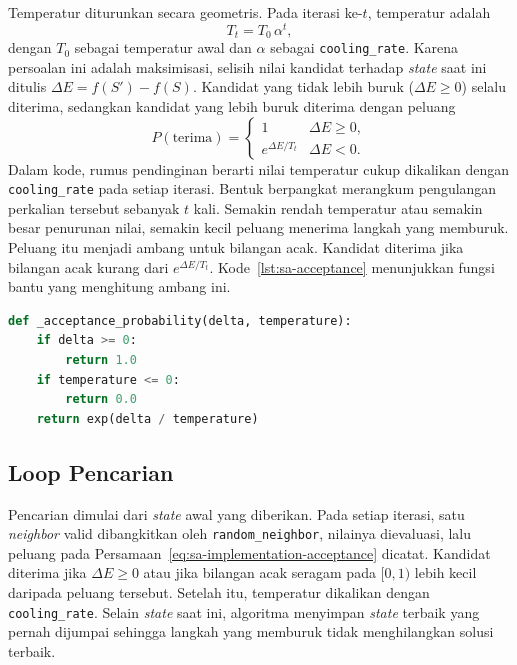 Temperatur diturunkan secara geometris. Pada iterasi ke-$t$, temperatur adalah
\begin{equation}
    T_t = T_0\,\alpha^{t},
    \label{eq:sa-implementation-cooling}
\end{equation}
dengan $T_0$ sebagai temperatur awal dan $\alpha$ sebagai \texttt{cooling\_rate}. Karena persoalan ini adalah maksimisasi, selisih nilai kandidat terhadap \textit{state} saat ini ditulis $\Delta E=f(S')-f(S)$. Kandidat yang tidak lebih buruk ($\Delta E\ge 0$) selalu diterima, sedangkan kandidat yang lebih buruk diterima dengan peluang
\begin{equation}
    P(\text{terima})=
    \begin{cases}
        1                & \Delta E \ge 0, \\
        e^{\Delta E/T_t} & \Delta E < 0.
    \end{cases}
    \label{eq:sa-implementation-acceptance}
\end{equation}
Dalam kode, rumus pendinginan berarti nilai temperatur cukup dikalikan dengan \texttt{cooling\_rate} pada setiap iterasi. Bentuk berpangkat merangkum pengulangan perkalian tersebut sebanyak $t$ kali. Semakin rendah temperatur atau semakin besar penurunan nilai, semakin kecil peluang menerima langkah yang memburuk. Peluang itu menjadi ambang untuk bilangan acak. Kandidat diterima jika bilangan acak kurang dari $e^{\Delta E/T_t}$. Kode~\ref{lst:sa-acceptance} menunjukkan fungsi bantu yang menghitung ambang ini.

\begin{lstlisting}[language=Python, caption={Peluang penerimaan kandidat},label={lst:sa-acceptance}]
def _acceptance_probability(delta, temperature):
    if delta >= 0:
        return 1.0
    if temperature <= 0:
        return 0.0
    return exp(delta / temperature)
\end{lstlisting}

\subsection{Loop Pencarian}

Pencarian dimulai dari \textit{state} awal yang diberikan. Pada setiap iterasi, satu \textit{neighbor} valid dibangkitkan oleh \texttt{random\_neighbor}, nilainya dievaluasi, lalu peluang pada Persamaan~\ref{eq:sa-implementation-acceptance} dicatat. Kandidat diterima jika $\Delta E\ge 0$ atau jika bilangan acak seragam pada $[0,1)$ lebih kecil daripada peluang tersebut. Setelah itu, temperatur dikalikan dengan \texttt{cooling\_rate}. Selain \textit{state} saat ini, algoritma menyimpan \textit{state} terbaik yang pernah dijumpai sehingga langkah yang memburuk tidak menghilangkan solusi terbaik.

